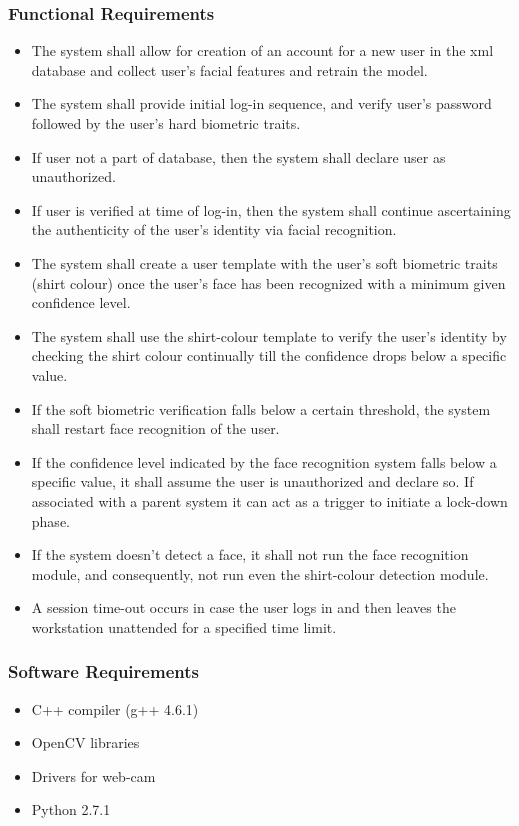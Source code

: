 \documentclass[12pt]{article}			%
\begin{document}
\subsubsection{ Functional Requirements }
\begin{itemize}
	\item The system shall allow for creation of an account for a new user in the xml database and collect user's facial features and retrain the model.
	\item The system shall provide initial log-in sequence, and verify user's password followed by the user's hard biometric traits.
	\item If user not a part of database, then the system shall declare user as unauthorized.
	\item If user is verified at time of log-in, then the system shall continue ascertaining the authenticity of the user's identity via facial recognition.
	\item The system shall create a user template with the user's soft biometric traits (shirt colour) once the user's face has been recognized with a minimum given confidence level.
	\item The system shall use the shirt-colour template to verify the user's identity by checking the shirt colour continually till the confidence drops below a specific value.
	\item If the soft biometric verification falls below a certain threshold, the system shall restart face recognition of the user.
	\item If the confidence level indicated by the face recognition system falls below a specific value, it shall assume the user is unauthorized and declare so. If associated with a parent system it can act as a trigger to initiate a lock-down phase.
	\item If the system doesn't detect a face, it shall not run the face recognition module, and consequently, not run even the shirt-colour detection module.
	\item A session time-out occurs in case the user logs in and then leaves the workstation unattended for a specified time limit.
\end{itemize}


\subsubsection{ Software Requirements }
\begin{itemize}
\item C++ compiler (g++ 4.6.1)
\item OpenCV libraries
\item Drivers for web-cam
\item Python 2.7.1
\end{itemize}
\end{document}
